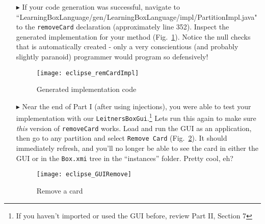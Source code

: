 \begin{itemize}

\item[$\blacktriangleright$] If your code generation was successful, navigate to
``Learning\-Box\-Language/\-gen/\-Learning\-Box\-Language/\-impl/\-Partition\-Impl.java" to the \texttt{\-remove\-Card} declaration (approximately line 352).
Inspect the generated implementation for your method (Fig.~\ref{fig:remCardImpl}). Notice the null checks that is automatically created - only a very
conscientious (and probably slightly paranoid) programmer would program so defensively!

\vspace{0.5cm}

\begin{figure}[htp]
\begin{center}
  \texttt{[image: eclipse\_remCardImpl]}
  \caption{Generated implementation code}
  \label{fig:remCardImpl}
\end{center}
\end{figure}

\newpage

\item[$\blacktriangleright$] Near the end of Part I (after using injections), you were able to test your implementation with our
\texttt{LeitnersBoxGui}.\footnote{If you haven't imported or used the GUI before, review Part II, Section 7} Lets run this again to make sure
\emph{this} version of \texttt{removeCard} works. Load and run the GUI as an application, then go to any partition and select
\texttt{Remove Card} (Fig.~\ref{fig:GUIRemCard}). It should immediately refresh, and you'll no longer be able to see the card in either the GUI or in the
\texttt{Box.xmi} tree in the ``instances'' folder. Pretty cool, eh?

\vspace{0.5cm}

\begin{figure}[htp]
\begin{center}
  \texttt{[image: eclipse\_GUIRemove]}
  \caption{Remove a card}
  \label{fig:GUIRemCard}
\end{center}
\end{figure}

\end{itemize}